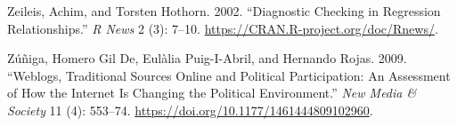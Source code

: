 \documentclass[12pt,]{article}
\begin{document}
\leavevmode\hypertarget{ref-lmtest}{}%
Zeileis, Achim, and Torsten Hothorn. 2002. ``Diagnostic Checking in
Regression Relationships.'' \emph{R News} 2 (3): 7--10.
\url{https://CRAN.R-project.org/doc/Rnews/}.

\leavevmode\hypertarget{ref-dezuniga2009}{}%
Zúñiga, Homero Gil De, Eulàlia Puig-I-Abril, and Hernando Rojas. 2009.
``Weblogs, Traditional Sources Online and Political Participation: An
Assessment of How the Internet Is Changing the Political Environment.''
\emph{New Media \& Society} 11 (4): 553--74.
\url{https://doi.org/10.1177/1461444809102960}.





\newpage
\singlespacing 
\end{document}
